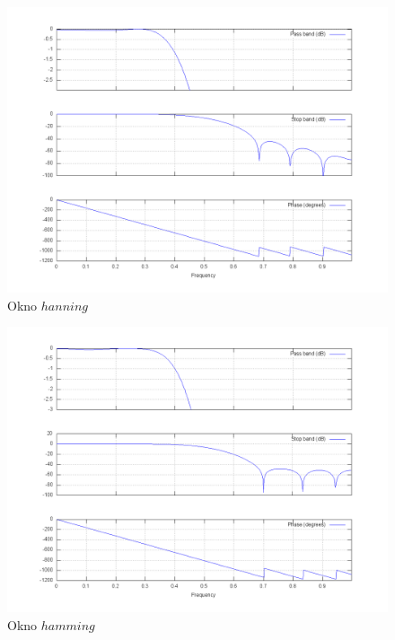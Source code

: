 \documentclass[wide,a4paper,titlepage,12pt]{mwart}
\begin{document}
	\begin{landscape}
	  \begin{figure}[htbp]
	    \begin{center}
	      \includegraphics[scale=.5]{out/fig5.png}
	      \caption{\label{fig5} Okno $hanning$}
	    \end{center}
	  \end{figure}
	\end{landscape}
	
	\begin{landscape}
	  \begin{figure}[htbp]
	    \begin{center}
	      \includegraphics[scale=.5]{out/fig6.png}
	      \caption{\label{fig6} Okno $hamming$}
	    \end{center}
	  \end{figure}
	\end{landscape}
	
\end{document}

